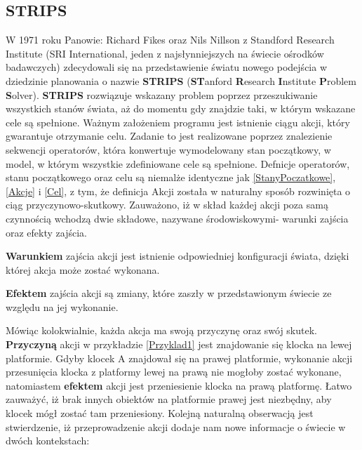     \subsection{STRIPS}
    \label{STRIPSRozdział}
    W 1971 roku Panowie: Richard Fikes oraz Nils Nillson z Standford Research Institute (SRI International, 
    jeden z najsłynniejszych na świecie ośrodków badawczych) zdecydowali się na przedstawienie światu
    nowego podejścia w dziedzinie planowania o nazwie \textbf{STRIPS} (\textbf{ST}anford \textbf{R}esearch \textbf{I}nstitute
    \textbf{P}roblem \textbf{S}olver)\cite{STRIPS}.
    \textbf{STRIPS} rozwiązuje wskazany problem poprzez przeszukiwanie wszystkich stanów świata, aż do momentu
    gdy znajdzie taki, w którym wskazane cele są spełnione. Ważnym założeniem programu jest istnienie
    ciągu akcji, który gwarantuje otrzymanie celu. Zadanie to jest realizowane poprzez znalezienie
    sekwencji operatorów, która konwertuje wymodelowany stan początkowy, w model, w którym wszystkie 
    zdefiniowane cele są spełnione. Defnicje operatorów, stanu początkowego oraz celu są niemalże identyczne jak 
    \ref{StanyPoczatkowe}, \ref{Akcje} i \ref{Cel}, z tym, że definicja Akcji została w naturalny sposób rozwinięta o ciąg przyczynowo-skutkowy. Zauważono, iż w skład każdej akcji 
    poza samą czynnością wchodzą dwie składowe, nazywane środowiskowymi- warunki zajścia oraz efekty zajścia. 
    \begin{definition}
        \label{WarunekAkcji}
        \textbf{Warunkiem} zajścia akcji jest istnienie odpowiedniej konfiguracji świata, dzięki której akcja może zostać wykonana.
    \end{definition}
    \begin{definition}
        \label{EfektAkcji}
        \textbf{Efektem} zajścia akcji są zmiany, które zaszły w przedstawionym świecie ze względu na jej wykonanie.
    \end{definition}
    Mówiąc kolokwialnie, każda akcja ma swoją przyczynę oraz swój skutek. \textbf{Przyczyną} akcji w przykładzie \ref{Przyklad1} jest znajdowanie się klocka na lewej platformie. Gdyby
    klocek A znajdował się na prawej platformie, wykonanie akcji przesunięcia klocka z platformy lewej na prawą nie mogłoby zostać wykonane, natomiastem \textbf{efektem} akcji jest 
    przeniesienie klocka na prawą platformę. Łatwo zauważyć, iż brak innych obiektów na platformie prawej jest niezbędny, aby klocek mógł zostać tam przeniesiony.
    Kolejną naturalną obserwacją jest stwierdzenie, iż przeprowadzenie akcji dodaje nam nowe informacje o świecie w dwóch kontekstach:
